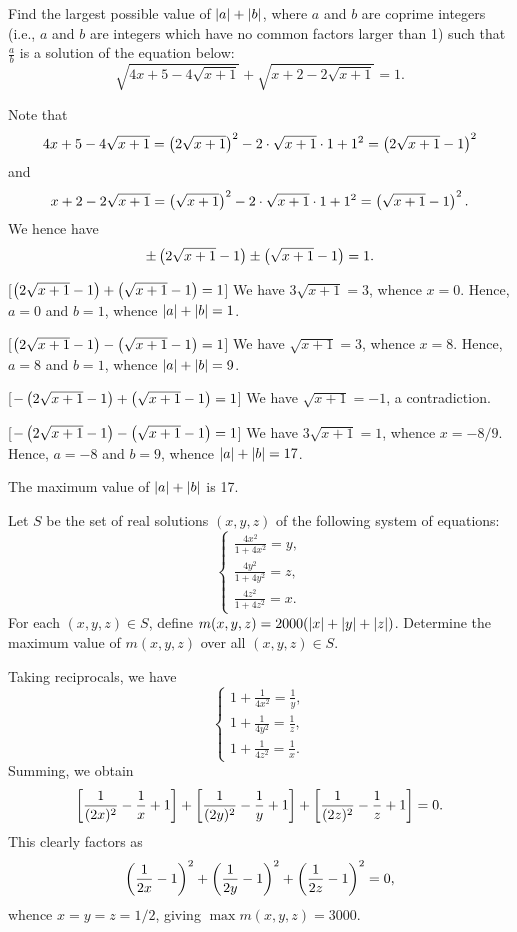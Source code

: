 \begin{question}[17]\label{A::2022-O-1-12}
    Find the largest possible value of $\left\lvert a \right\rvert + \left\lvert b \right\rvert$, where $a$ and $b$ are coprime integers (i.e., $a$ and $b$ are integers which have no common factors larger than 1) such that $\frac{a}{b}$ is a solution of the equation below: \[\sqrt{4x + 5 - 4\sqrt{x+1}} + \sqrt{x+2 - 2\sqrt{x+1}} = 1.\]
\end{question}
\begin{solution*}
    Note that \[4x + 5 - 4\sqrt{x+1} = \left( 2\sqrt{x+1} \right)^2 - 2\cdot\sqrt{x+1}\cdot1 + 1^2 = \left( 2\sqrt{x+1} - 1 \right)^2\] and \[x + 2 - 2\sqrt{x+1} = \left( \sqrt{x+1} \right)^2 - 2\cdot\sqrt{x+1}\cdot 1 + 1^2 = \left( \sqrt{x+1} - 1 \right)^2.\] We hence have \[\pm \left( 2\sqrt{x+1} - 1 \right) \pm \left( \sqrt{x+1} - 1 \right) = 1.\]

    [$\left( 2\sqrt{x+1} - 1 \right) + \left( \sqrt{x+1} - 1 \right) = 1$] We have $3\sqrt{x+1} = 3$, whence $x = 0$. Hence, $a = 0$ and $b = 1$, whence $\left\lvert a \right\rvert + \left\lvert b \right\rvert = 1$.

    [$\left( 2\sqrt{x+1} - 1 \right) - \left( \sqrt{x+1} - 1 \right) = 1$] We have $\sqrt{x+1} = 3$, whence $x = 8$. Hence, $a = 8$ and $b = 1$, whence $\left\lvert a \right\rvert + \left\lvert b \right\rvert = 9$.

    [$-\left( 2\sqrt{x+1} - 1 \right) + \left( \sqrt{x+1} - 1 \right) = 1$] We have $\sqrt{x+1} = -1$, a contradiction.

    [$-\left( 2\sqrt{x+1} - 1 \right) - \left( \sqrt{x+1} - 1 \right) = 1$] We have $3\sqrt{x+1} = 1$, whence $x = -8/9$. Hence, $a = -8$ and $b = 9$, whence $\left\lvert a \right\rvert + \left\lvert b \right\rvert = 17$.

    The maximum value of $\left\lvert a \right\rvert + \left\lvert b \right\rvert$ is 17.
\end{solution*}

\begin{question}[3000]\label{A::2022-O-1-13}
    Let $S$ be the set of real solutions $(x, y, z)$ of the following system of equations: \[\left\{
        \begin{aligned}
            \frac{4x^2}{1 + 4x^2} = y,\\
            \frac{4y^2}{1 + 4y^2} = z,\\
            \frac{4z^2}{1 + 4z^2} = x.
        \end{aligned}\right.\] For each $(x, y, z) \in S$, define $m(x, y, z) = 2000(\left\lvert x \right\rvert + \left\lvert y \right\rvert + \left\lvert z \right\rvert)$. Determine the maximum value of $m(x, y, z)$ over all $(x, y, z) \in S$.
\end{question}
\begin{solution*}
    Taking reciprocals, we have \[\left\{
    \begin{aligned}
        1 + \frac1{4x^2} = \frac1y,\\
        1 + \frac1{4y^2} = \frac1z,\\
        1 + \frac1{4z^2} = \frac1x.
    \end{aligned}\right.\] Summing, we obtain \[\left[ \dfrac1{(2x)^2} - \dfrac1x + 1 \right] + \left[ \dfrac1{(2y)^2} - \dfrac1y + 1 \right] + \left[ \dfrac1{(2z)^2} - \dfrac1z + 1 \right] = 0.\] This clearly factors as \[\left( \dfrac1{2x} - 1 \right)^2 + \left( \dfrac1{2y} - 1 \right)^2 + \left( \dfrac1{2z} - 1 \right)^2 = 0,\] whence $x = y = z = 1/2$, giving $\max m(x, y, z) = 3000$.
\end{solution*}

